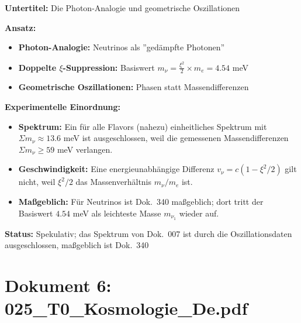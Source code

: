 	\begin{documentbox}
		\textbf{Untertitel:} Die Photon-Analogie und geometrische Oszillationen
		
		\textbf{Ansatz:}
		\begin{itemize}
			\item \textbf{Photon-Analogie:} Neutrinos als ''gedämpfte Photonen''
			\item \textbf{Doppelte $\xi$-Suppression:} Basiswert $m_\nu = \frac{\xi^2}{2} \times m_e = 4.54$ meV
			\item \textbf{Geometrische Oszillationen:} Phasen statt Massendifferenzen
		\end{itemize}
		
		\textbf{Experimentelle Einordnung:}
		\begin{itemize}
			\item \textbf{Spektrum:} Ein für alle Flavors (nahezu) einheitliches Spektrum mit $\Sigma m_\nu \approx 13.6$ meV ist ausgeschlossen, weil die gemessenen Massendifferenzen $\Sigma m_\nu \geq 59$ meV verlangen.
			\item \textbf{Geschwindigkeit:} Eine energieunabhängige Differenz $v_\nu = c(1 - \xi^2/2)$ gilt nicht, weil $\xi^2/2$ das Massenverhältnis $m_\nu/m_e$ ist.
			\item \textbf{Maßgeblich:} Für Neutrinos ist Dok.~340 maßgeblich; dort tritt der Basiswert $4.54$ meV als leichteste Masse $m_{\nu_1}$ wieder auf.
		\end{itemize}
		
		\textbf{Status:} Spekulativ; das Spektrum von Dok.~007 ist durch die Oszillationsdaten ausgeschlossen, maßgeblich ist Dok.~340
	\end{documentbox}
	
	\section{Dokument 6: 025\_T0\_Kosmologie\_De.pdf}
	
